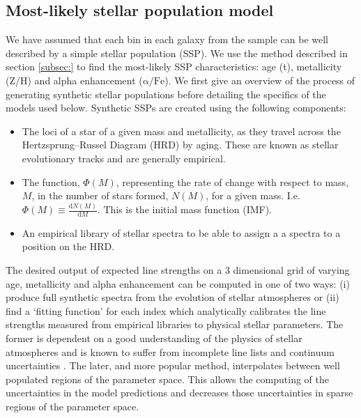 
	\subsection{Most-likely stellar population model}
		\label{subsec:ssp}
		We have assumed that each bin in each galaxy from the sample can be well described by a simple stellar population (SSP). We use the method described in section \ref{subsec:} to find the most-likely SSP characteristics: age (t), metallicity (Z/H) and alpha enhancement ($\mathrm{\alpha/Fe}$). We first give an overview of the process of generating synthetic stellar populations before detailing the specifics of the models used below. Synthetic SSPs are created using the following components:
		\begin{itemize}
			\item The loci of a star of a given mass and metallicity, as they travel across the Hertzsprung--Russel Diagram (HRD) by aging. These are known as stellar evolutionary tracks and are generally empirical.
			\item The function, $\Phi(M)$, representing the rate of change with respect to mass, $M$, in the number of stars formed, $N(M)$, for a given mass. I.e. $\Phi(M) \equiv \frac{\mathrm{d}N(M)}{\mathrm{d}M}$. This is the initial mass function (IMF).
			\item An empirical library of stellar spectra to be able to assign a a spectra to a position on the HRD. 
		\end{itemize}
		The desired output of expected line strengths on a 3 dimensional grid of varying age, metallicity and alpha enhancement can be computed in one of two ways: (i) produce full synthetic spectra from the evolution of stellar atmospheres or (ii) find a `fitting function' for each index which analytically calibrates the line strengths measured from empirical libraries to physical stellar parameters. The former is dependent on a good understanding of the physics of stellar atmospheres and is known to suffer from incomplete line lists and continuum uncertainties \citep{Thomas2004}. The later, and more popular method, interpolates between well populated regions of the parameter space. This allows the computing of the uncertainties in the model predictions and decreases those uncertainties in sparse regions of the parameter space. 


